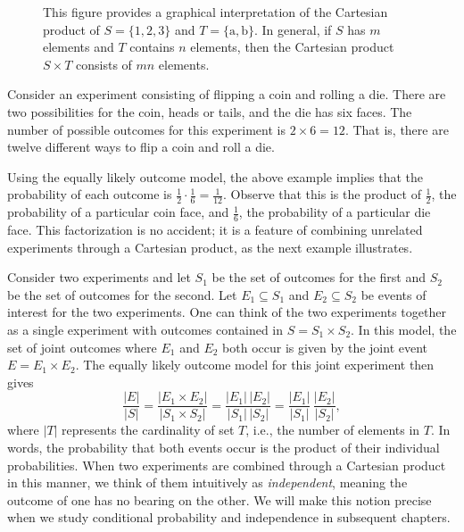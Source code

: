 \begin{figure}[htb!]
\begin{center}
\begin{footnotesize}
\end{footnotesize}
\caption{This figure provides a graphical interpretation of the Cartesian product of $S = \{ 1, 2, 3 \}$ and $T = \{ \mathrm{a}, \mathrm{b} \}$.
In general, if $S$ has $m$ elements and $T$ contains $n$ elements, then the Cartesian product $S \times T$ consists of $m n$ elements.}
\label{figure:CountingPrinciple}
\end{center}
\end{figure}

\begin{example}
Consider an experiment consisting of flipping a coin and rolling a die.
There are two possibilities for the coin, heads or tails, and the die has six faces.
The number of possible outcomes for this experiment is $2 \times 6 = 12$.
That is, there are twelve different ways to flip a coin and roll a die.
\end{example}

Using the equally likely outcome model, the above example implies that the probability of each outcome is $\frac{1}{2} \cdot \frac{1}{6} = \frac{1}{12}$.
Observe that this is the product of $\frac{1}{2}$, the probability of a particular coin face, and $\frac{1}{6}$, the probability of a particular die face.
This factorization is no accident; it is a feature of combining unrelated experiments through a Cartesian product, as the next example illustrates.

\begin{example}
Consider two experiments and let $S_1$ be the set of outcomes for the first and $S_2$ be the set of outcomes for the second.
Let $E_1 \subseteq S_1$ and $E_2 \subseteq S_2$ be events of interest for the two experiments.
One can think of the two experiments together as a single experiment with outcomes contained in $S = S_1 \times S_2$.
In this model, the set of joint outcomes where $E_1$ and $E_2$ both occur is given by the joint event $E = E_1 \times E_2$.
The equally likely outcome model for this joint experiment then gives
\begin{equation*}
\frac{|E|}{|S|} = \frac{|E_1 \times E_2|}{|S_1 \times S_2|}
= \frac{|E_1|\,|E_2|}{|S_1|\,|S_2|}
= \frac{|E_1|}{|S_1|}\,\frac{|E_2|}{|S_2|},
\end{equation*}
where $|T|$ represents the cardinality of set $T$, i.e., the number of elements in $T$.
In words, the probability that both events occur is the product of their individual probabilities.
When two experiments are combined through a Cartesian product in this manner, we think of them intuitively as \emph{independent}, meaning the outcome of one has no bearing on the other.
We will make this notion precise when we study conditional probability and independence in subsequent chapters.
\end{example}


